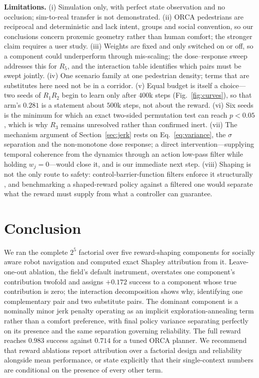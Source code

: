 \documentclass[conference]{IEEEtran}
\begin{document}
\textbf{Limitations.} (i) Simulation only, with perfect state observation and no
occlusion; sim-to-real transfer is not demonstrated. (ii) ORCA pedestrians are
reciprocal and deterministic and lack intent, groups and social convention, so our
conclusions concern proxemic geometry rather than human comfort; the stronger
claim requires a user study. (iii) Weights are fixed and only switched on or off,
so a component could underperform through mis-scaling; the dose--response sweep
addresses this for $R_5$, and the interaction table identifies which pairs must
be swept jointly. (iv) One scenario family at one
pedestrian density; terms that are substitutes here need not be in a corridor.
(v) Equal budget is itself a choice---two seeds of $R_1R_2$ begin to learn only
after $400$k steps (Fig.~\ref{fig:curves}), so that arm's $0.281$ is a statement
about $500$k steps, not about the reward. (vi) Six seeds is the minimum for which
an exact two-sided permutation test can reach $p<0.05$, which is why $R_3$ remains
unresolved rather than confirmed inert. (vii) The mechanism argument of
Section~\ref{sec:jerk} rests on Eq.~\eqref{eq:variance}, the $\sigma$ separation and the non-monotone dose
response; a direct intervention---supplying temporal coherence from the dynamics
through an action low-pass filter while holding $w_j=0$---would close it, and is
our immediate next step. (viii) Shaping is not the only route to safety:
control-barrier-function filters enforce it structurally \cite{ames2016control},
and benchmarking a shaped-reward policy against a filtered one would separate
what the reward must supply from what a controller can guarantee.

\section{Conclusion}
We ran the complete $2^5$ factorial over five reward-shaping components for
socially aware robot navigation and computed exact Shapley attribution from it.
Leave-one-out ablation, the field's default instrument, overstates one component's
contribution twofold and assigns $+0.172$ success to a component whose true
contribution is zero; the interaction decomposition shows why, identifying one
complementary pair and two substitute pairs. The dominant component is a nominally
minor jerk penalty operating as an implicit exploration-annealing term rather than
a comfort preference, with final policy variance separating perfectly on its
presence and the same separation governing reliability. The full reward reaches
$0.983$ success against $0.714$ for a tuned ORCA planner. We recommend that reward
ablations report attribution over a factorial design and reliability alongside
mean performance, or state explicitly that their single-context numbers are
conditional on the presence of every other term.
\end{document}
